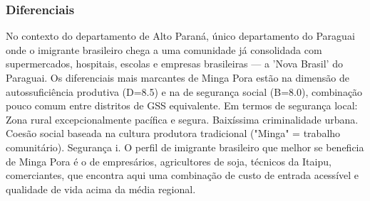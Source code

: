 \subsubsection*{Diferenciais}\label{dif-minga-pora-1016}
No contexto do departamento de Alto Paraná, único departamento do Paraguai onde o imigrante brasileiro chega a uma comunidade já consolidada com supermercados, hospitais, escolas e empresas brasileiras — a 'Nova Brasil' do Paraguai. Os diferenciais mais marcantes de Minga Pora estão na dimensão de autossuficiência produtiva (D=8.5) e na de segurança social (B=8.0), combinação pouco comum entre distritos de GSS equivalente. Em termos de segurança local: Zona rural excepcionalmente pacífica e segura. Baixíssima criminalidade urbana. Coesão social baseada na cultura produtora tradicional ("Minga" = trabalho comunitário). Segurança i. O perfil de imigrante brasileiro que melhor se beneficia de Minga Pora é o de empresários, agricultores de soja, técnicos da Itaipu, comerciantes, que encontra aqui uma combinação de custo de entrada acessível e qualidade de vida acima da média regional.
